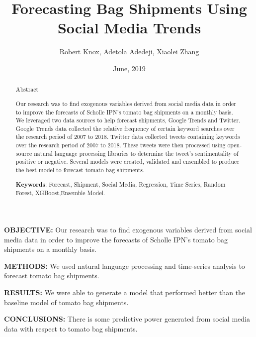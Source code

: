\documentclass[12pt,oneside]{chicagocapstone}
\title{Forecasting Bag Shipments Using Social Media Trends}
\author{Robert Knox, Adetola Adedeji, Xiaolei Zhang}
\date{June, 2019} %
\begin{document}
  \maketitle

\frontmatter %
\pagestyle{empty} %


  \begin{abstract}
    Abstract
    
    Our research was to find exogenous variables derived from social media
    data in order to improve the forecasts of Scholle IPN's tomato bag
    shipments on a monthly basis. We leveraged two data sources to help
    forecast shipments, Google Trends and Twitter. Google Trends data
    collected the relative frequency of certain keyword searches over the
    research period of 2007 to 2018. Twitter data collected tweets
    containing keywords over the research period of 2007 to 2018. These
    tweets were then processed using open-source natural language processing
    libraries to determine the tweet's sentimentality of positive or
    negative. Several models were created, validated and ensembled to
    produce the best model to forecast tomato bag shipments.
    
    \bigskip  \bigskip
    \bigskip
    
    \textbf{Keywords}: Forecast, Shipment, Social Media, Regression, Time
    Series, Random Forest, XGBoost,Ensemble Model.
    
    \bigskip  \bigskip
    \bigskip
  \end{abstract}
  \begin{executive}
    \textbf{OBJECTIVE:} Our research was to find exogenous variables derived
    from social media data in order to improve the forecasts of Scholle
    IPN's tomato bag shipments on a monthly basis.
    
    \textbf{METHODS:} We used natural language processing and time-series
    analysis to forecast tomato bag shipments.
    
    \textbf{RESULTS:} We were able to generate a model that performed better
    than the baseline model of tomato bag shipments.
    
    \textbf{CONCLUSIONS:} There is some predictive power generated from
    social media data with respect to tomato bag shipments.
    
    \bigskip
    \bigskip
    \bigskip
  \end{executive}
\end{document}

